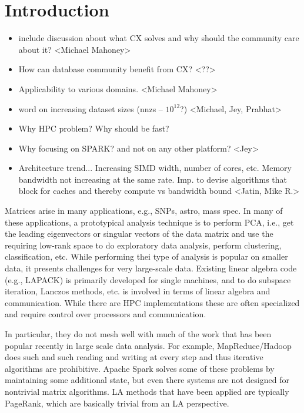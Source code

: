 \section{Introduction}
\begin{itemize}

\item include discussion about what CX solves and why should the community care about it? <Michael Mahoney>

\item How can database community benefit from CX? <??>

\item Applicability to various domains. <Michael Mahoney>

\item word on increasing dataset sizes (nnzs -- $10^{12}$?)  <Michael, Jey, Prabhat>
 \item Why HPC problem? Why should be fast?

\item Why focusing on SPARK? and not on any other platform? <Jey>

\item Architecture trend... Increasing SIMD width, number of cores, etc. Memory bandwidth not increasing at the same rate. Imp. to devise algorithms that block for caches and thereby compute vs bandwidth bound <Jatin, Mike R.>
    
\end{itemize}

Matrices arise in many applications, e.g., SNPs, astro, mass spec.
In many of these applications, a prototypical analysis technique is to perform PCA, i.e., get the leading eigenvectors or singular vectors of the data matrix and use the requiring low-rank space to do exploratory data analysis, perform clustering, classification, etc.
While performing thei type of analysis is popular on smaller data, it presents challenges for very large-scale data.  
Existing linear algebra code (e.g., LAPACK) is primarily developed for single machines, and to do subspace iteration, Lanczos methods, etc. is involved in terms of linear algebra and communication.  
While there are HPC implementations these are often specialized and require control over processors and communication.

In particular, they do not mesh well with much of the work that has been popular recently in large scale data analysis.
For example, MapReduce/Hadoop does such and such reading and writing at every step and thus iterative algorithms are prohibitive. 
Apache Spark solves some of these problems by maintaining some additional state, but even there systems are not designed for nontrivial matrix algorithms.
LA methods that have been applied are typically PageRank, which are basically trivial from an LA perspective.

